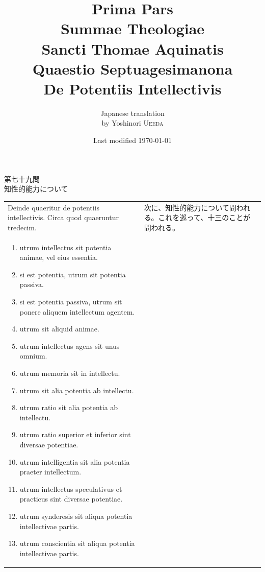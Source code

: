\documentclass[paper=a4paper,fontsize=10pt,jafontsize=9pt,titlepage]{jlreq}
\title{{\bfseries Prima Pars}\\{\Huge Summae Theologiae}\\Sancti Thomae
Aquinatis\\{\sffamily Quaestio Septuagesimanona}\\{\bfseries De Potentiis Intellectivis}}
\author{Japanese translation\\by Yoshinori {\scshape Ueeda}}
\date{Last modified \today}
\begin{document}
\maketitle

\begin{center}
{\Large 第七十九問\\
知性的能力について}
\end{center}


\begin{longtable}{p{21em}p{21em}}
 Deinde quaeritur de potentiis intellectivis. Circa quod quaeruntur tredecim.

 &


 次に、知性的能力について問われる。これを巡って、十三のことが問われる。
 
\\[1em]

 \begin{enumerate}
  \item utrum intellectus sit potentia animae, vel eius essentia.
  \item si est potentia, utrum sit potentia passiva.
  \item si est potentia passiva, utrum sit ponere aliquem intellectum agentem.
  \item utrum sit aliquid animae.
  \item utrum intellectus agens sit unus omnium.
  \item utrum memoria sit in intellectu.
  \item utrum sit alia potentia ab intellectu.
  \item utrum ratio sit alia potentia ab intellectu.
  \item utrum ratio superior et inferior sint diversae potentiae.
  \item utrum intelligentia sit alia potentia praeter intellectum.
  \item utrum intellectus speculativus et practicus sint diversae potentiae.
  \item utrum synderesis sit aliqua potentia intellectivae partis.
  \item utrum conscientia sit aliqua potentia intellectivae partis.
 \end{enumerate}

&
 

\end{longtable}
\end{document}
